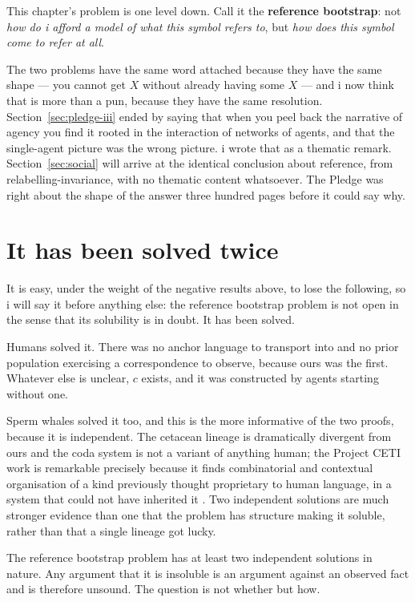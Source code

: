 This chapter's problem is one level down.
Call it the \textbf{reference bootstrap}: not \emph{how do i afford
a model of what this symbol refers to}, but \emph{how does this
symbol come to refer at all}.

The two problems have the same word attached because they have the
same shape --- you cannot get $X$ without already having some $X$
--- and i now think that is more than a pun, because they have the
same resolution.
Section~\ref{sec:pledge-iii} ended by saying that when you peel
back the narrative of agency you find it rooted in the interaction
of networks of agents, and that the single-agent picture was the
wrong picture.
i wrote that as a thematic remark.
Section~\ref{sec:social} will arrive at the identical conclusion
about reference, from relabelling-invariance, with no thematic
content whatsoever.
The Pledge was right about the shape of the answer three hundred
pages before it could say why.

\section{It has been solved twice}
\label{sec:soluble}

It is easy, under the weight of the negative results above, to lose
the following, so i will say it before anything else:
the reference bootstrap problem is not open in the sense that its
solubility is in doubt.
It has been solved.

Humans solved it.
There was no anchor language to transport into and no prior
population exercising a correspondence to observe, because ours was
the first.
Whatever else is unclear, $c$ exists, and it was constructed by
agents starting without one.

Sperm whales solved it too, and this is the more informative of the
two proofs, because it is independent.
The cetacean lineage is dramatically divergent from ours and the
coda system is not a variant of anything human; the Project CETI
work is remarkable precisely because it finds combinatorial and
contextual organisation of a kind previously thought proprietary to
human language, in a system that could not have inherited it
\cite{sharma2024,begus2026}.
Two independent solutions are much stronger evidence than one that
the problem has structure making it soluble, rather than that a
single lineage got lucky.

\begin{observation}[Existence]
\label{obs:soluble}
The reference bootstrap problem has at least two independent
solutions in nature.
Any argument that it is insoluble is an argument against an
observed fact and is therefore unsound.
The question is not whether but how.
\end{observation}

